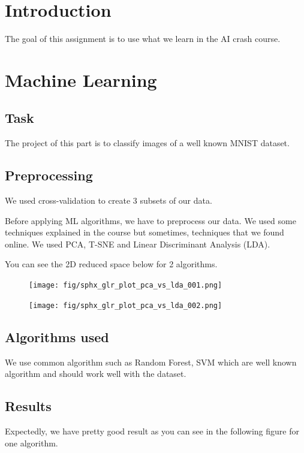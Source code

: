 \documentclass[12pt,a4paper]{article}
\begin{document}
\section*{Introduction}
The goal of this assignment is to use what we learn in the AI crash course.

\section{Machine Learning}

\subsection{Task}

The project of this part is to classify images of a well known MNIST dataset.

\subsection{Preprocessing}
We used cross-validation to create 3 subsets of our data.

Before applying ML algorithms, we have to preprocess our data. We used some techniques explained in the course but sometimes, techniques that we found online. We used PCA, T-SNE and Linear Discriminant Analysis (LDA).


You can see the 2D reduced space below for 2 algorithms.

\begin{figure}[h]
\centering
\texttt{[image: fig/sphx\_glr\_plot\_pca\_vs\_lda\_001.png]}
\end{figure}

\begin{figure}[h]
\centering
\texttt{[image: fig/sphx\_glr\_plot\_pca\_vs\_lda\_002.png]}
\end{figure}

\pagebreak

\subsection{Algorithms used}
We use common algorithm such as Random Forest, SVM which are well known algorithm and should work well with the dataset.

\subsection{Results}
Expectedly, we have pretty good result as you can see in the following figure for one algorithm.
\end{document}

